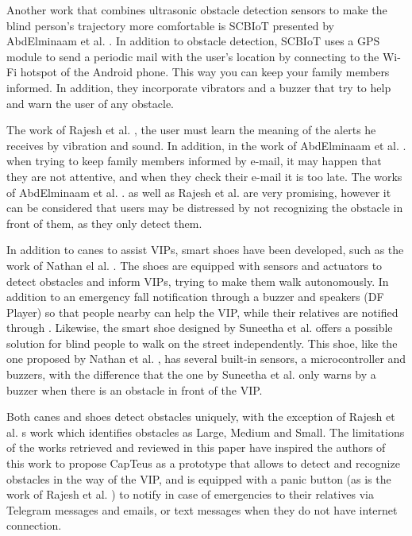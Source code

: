 \documentclass{svproc}
\begin{document}
Another work that combines ultrasonic obstacle detection sensors to make
the blind person’s trajectory more comfortable is SCBIoT presented by AbdElminaam
et al. \cite{AbdElminaam2022}. In addition to obstacle detection, SCBIoT uses a GPS
module to send a periodic mail with the user’s location by connecting to the Wi-
Fi hotspot of the Android phone. This way you can keep your family members
informed. In addition, they incorporate vibrators and a buzzer that try to help
and warn the user of any obstacle.

The work of Rajesh et al. \cite{Rajesh2023}, the user must learn the meaning of the alerts he
receives by vibration and sound. In addition, in the work of AbdElminaam et
al. \cite{AbdElminaam2022}. when trying to keep family members informed by e-mail, it may happen
that they are not attentive, and when they check their e-mail it is too late. The
works of AbdElminaam et al. \cite{AbdElminaam2022}. as well as Rajesh et al. \cite{Rajesh2023} are very promising, however it can be considered that users may be distressed by not recognizing
the obstacle in front of them, as they only detect them.

In addition to canes to assist VIPs, smart shoes have been developed, such as
the work of Nathan el al. \cite{Nathan2023}. The shoes are equipped with sensors and actuators
to detect obstacles and inform VIPs, trying to make them walk autonomously.
In addition to an emergency fall notification through a buzzer and speakers (DF
Player) so that people nearby can help the VIP, while their relatives are notified
through \cite{Blynk2023}. Likewise, the smart shoe designed by Suneetha et al. \cite{Suneetha}
offers a possible solution for blind people to walk on the street independently.
This shoe, like the one proposed by Nathan et al. \cite{Nathan2023}, has several built-in sensors,
a microcontroller and buzzers, with the difference that the one by Suneetha et
al. \cite{Suneetha} only warns by a buzzer when there is an obstacle in front of the VIP.

Both canes and shoes detect obstacles uniquely, with the exception of Rajesh et al. \cite{Rajesh2023}
s work which identifies obstacles as Large, Medium and Small. The limitations of the works retrieved and reviewed in this paper have inspired the authors of this work to propose CapTeus as a prototype that allows to detect and recognize obstacles in the way of the VIP, and is equipped with a panic
button (as is the work of Rajesh et al. \cite{Rajesh2023}) to notify in case of emergencies to their relatives via Telegram messages and emails, or text messages when they
do not have internet connection.
\end{document}

